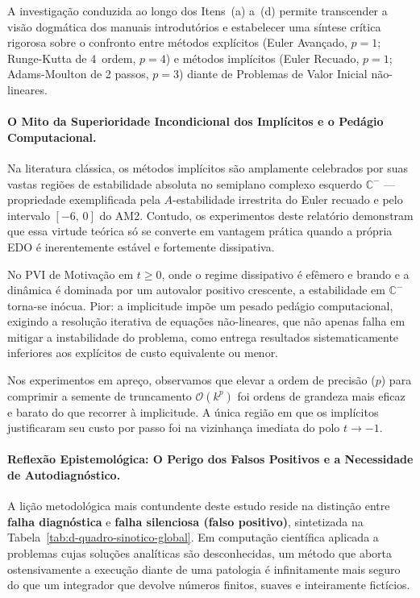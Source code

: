 \documentclass[12pt, a4paper]{article}
\begin{document}
A investigação conduzida ao longo dos Itens~(a) a~(d) permite transcender a visão dogmática dos manuais introdutórios e estabelecer uma síntese crítica rigorosa sobre o confronto entre métodos explícitos (Euler Avançado, $p=1$; Runge-Kutta de 4\textordfeminine~ordem, $p=4$) e métodos implícitos (Euler Recuado, $p=1$; Adams-Moulton de 2 passos, $p=3$) diante de Problemas de Valor Inicial não-lineares.

\paragraph{O Mito da Superioridade Incondicional dos Implícitos e o Pedágio Computacional.}
Na literatura clássica, os métodos implícitos são amplamente celebrados por suas vastas regiões de estabilidade absoluta no semiplano complexo esquerdo $\mathbb{C}^-$ — propriedade exemplificada pela $A$-estabilidade irrestrita do Euler recuado e pelo intervalo $[-6,\, 0]$ do AM2. Contudo, os experimentos deste relatório demonstram que essa virtude teórica só se converte em vantagem prática quando a própria EDO é inerentemente estável e fortemente dissipativa.

No PVI de Motivação em $t \ge 0$, onde o regime dissipativo é efêmero e brando e a dinâmica é dominada por um autovalor positivo crescente, a estabilidade em $\mathbb{C}^-$ torna-se inócua. Pior: a implicitude impõe um pesado pedágio computacional, exigindo a resolução iterativa de equações não-lineares, que não apenas falha em mitigar a instabilidade do problema, como entrega resultados sistematicamente inferiores aos explícitos de custo equivalente ou menor.

Nos experimentos em apreço, observamos que elevar a ordem de precisão ($p$) para comprimir a semente de truncamento $\mathcal{O}(k^p)$ foi ordens de grandeza mais eficaz e barato do que recorrer à implicitude. A única região em que os implícitos justificaram seu custo por passo foi na vizinhança imediata do polo $t \to -1$.

\paragraph{Reflexão Epistemológica: O Perigo dos Falsos Positivos e a Necessidade de Autodiagnóstico.}
A lição metodológica mais contundente deste estudo reside na distinção entre \textbf{falha diagnóstica} e \textbf{falha silenciosa (falso positivo)}, sintetizada na Tabela~\ref{tab:d-quadro-sinotico-global}. Em computação científica aplicada a problemas cujas soluções analíticas são desconhecidas, um método que aborta ostensivamente a execução diante de uma patologia é infinitamente mais seguro do que um integrador que devolve números finitos, suaves e inteiramente fictícios.
\end{document}
